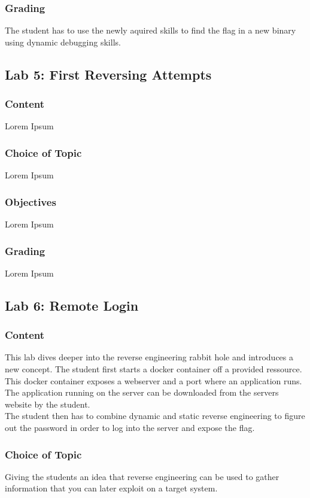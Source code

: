 \subsubsection*{Grading}
The student has to use the newly aquired skills to find the flag in a new binary using dynamic debugging skills.

\subsection{Lab 5: First Reversing Attempts}
\subsubsection*{Content}
Lorem Ipsum
\subsubsection*{Choice of Topic}
Lorem Ipsum
\subsubsection*{Objectives}
Lorem Ipsum
\subsubsection*{Grading}
Lorem Ipsum

\subsection{Lab 6: Remote Login}
\subsubsection*{Content}
This lab dives deeper into the reverse engineering rabbit hole and introduces a new concept. The student first starts a docker container off a provided ressource.
This docker container exposes a webserver and a port where an application runs. The application running on the server can be downloaded from the servers website by the student. \\
The student then has to combine dynamic and static reverse engineering to figure out the password in order to log into the server and expose the flag.
\subsubsection*{Choice of Topic}
Giving the students an idea that reverse engineering can be used to gather information that you can later exploit on a target system.
